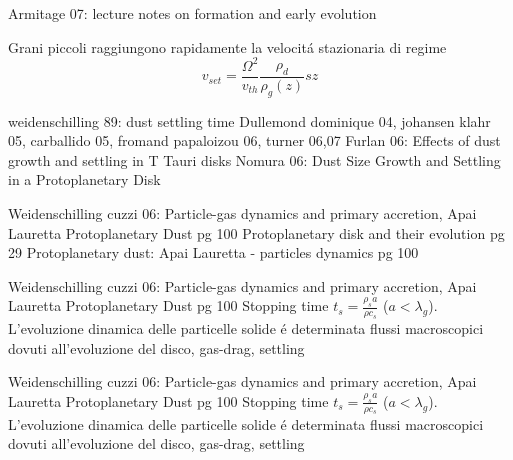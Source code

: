 \begin{workout}
Armitage 07: lecture notes on formation and early evolution
 \end{workout}

\begin{workout}	
Grani piccoli raggiungono rapidamente la velocit\'a stazionaria di regime
\begin{equation}
v_{set}=\frac{\Omega^2}{v_{th}}\frac{\rho_d}{\rho_g(z)}sz
\end{equation}
 \end{workout}
 
\begin{workout}
weidenschilling 89: dust settling time
Dullemond dominique 04, johansen klahr 05, carballido 05, fromand papaloizou 06, turner 06,07
Furlan 06: Effects of dust growth and settling in T Tauri disks
Nomura 06: Dust Size Growth and Settling in a Protoplanetary Disk
\cite{lissauer1993planet}
 \end{workout}

\begin{workout}
Weidenschilling cuzzi 06: Particle-gas dynamics and primary accretion, Apai Lauretta Protoplanetary Dust pg 100
Protoplanetary disk and their evolution pg 29
Protoplanetary dust: Apai Lauretta - particles dynamics pg 100
\end{workout}

\begin{workout}
Weidenschilling cuzzi 06: Particle-gas dynamics and primary accretion, Apai Lauretta Protoplanetary Dust pg 100
Stopping time $t_s=\frac{\rho_sa}{\rho c_s}$ ($a<\lambda_g$). L'evoluzione dinamica delle particelle solide \'e determinata flussi macroscopici dovuti all'evoluzione del disco, gas-drag, settling
\end{workout}

\begin{workout}
Weidenschilling cuzzi 06: Particle-gas dynamics and primary accretion, Apai Lauretta Protoplanetary Dust pg 100
Stopping time $t_s=\frac{\rho_sa}{\rho c_s}$ ($a<\lambda_g$). L'evoluzione dinamica delle particelle solide \'e determinata flussi macroscopici dovuti all'evoluzione del disco, gas-drag, settling
\end{workout}


